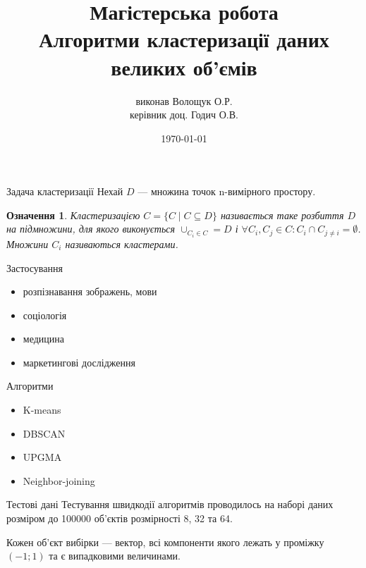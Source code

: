 \documentclass{beamer}
\title{Магістерська робота\\Алгоритми кластеризації даних великих об’ємів}
\author{виконав Волощук О.Р.\\керівник доц. Годич О.В.}
\date{\today}
\newtheorem{defn}{Означення}
\begin{document}
    \begin{frame}
        \maketitle
    \end{frame}

    \begin{frame}{Задача кластеризації}
        Нехай $D$ --- множина точок n-вимірного простору. 
        \begin{defn}
            \emph{Кластеризацією} $C = \{C \mid C \subseteq D\}$ називається таке розбиття $D$ на підмножини, 
            для якого виконується $\cup_{C_i \in C} = D$ і $\forall C_i, C_j \in C : C_i \cap C_{j \neq i} = \emptyset$. 
            Множини $C_i$ називаються кластерами.
        \end{defn}
    \end{frame}
    
    
    \begin{frame}{Застосування}
        \begin{itemize}
            \item розпізнавання зображень, мови
            \item соціологія
            \item медицина
            \item маркетингові дослідження
        \end{itemize}
    \end{frame}
    
    
    \begin{frame}{Алгоритми}
        \begin{itemize}
            \item K-means
            \item DBSCAN
            \item UPGMA
            \item Neighbor-joining
        \end{itemize}
    \end{frame}
    
    
    \begin{frame}{Тестові дані}
        Тестування швидкодії алгоритмів проводилось на наборі даних розміром до 100000 об’єктів розмірності 8, 32 та 64.
        
        Кожен об’єкт вибірки --- вектор, всі компоненти якого лежать у проміжку $(-1; 1)$ та є випадковими величинами.
    \end{frame}
    
\end{document}
